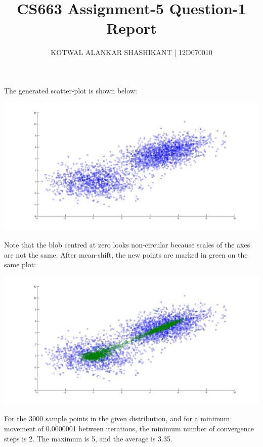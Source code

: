 \documentclass[11pt]{report}
\begin{document}
\title{CS663 Assignment-5 Question-1 Report}
\author{KOTWAL ALANKAR SHASHIKANT | 12D070010}
\maketitle

The generated scatter-plot is shown below:\newline \newline
\centerline{\includegraphics[scale=0.3]{scatter.png}}
\newline
\newline
Note that the blob centred at zero looks non-circular because scales of the axes are not the same.
\newline
After mean-shift, the new points are marked in green on the same plot:
\centerline{\includegraphics[scale=0.3]{cluster.png}}
\newline
\newline
For the 3000 sample points in the given distribution, and for a minimum movement of 0.0000001 between iterations, the minimum number of convergence steps is 2. The maximum is 5, and the average is 3.35.
\end{document}
